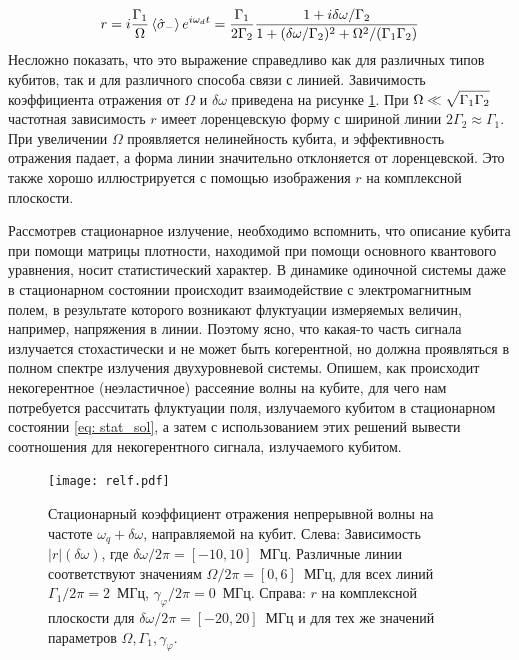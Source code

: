 \begin{equation}
r = i\frac{\Gamma_1}{\Omega}\braket{\hat{\sigma}_-}e^{i\omega_d t} = \frac{\Gamma_1}{2\Gamma_2}\frac{1+i\delta\omega/\Gamma_2}{1+(\delta\omega/\Gamma_2)^2+\Omega^2/(\Gamma_1\Gamma_2)}
\label{eq: refl}
\end{equation}
Несложно показать, что это выражение справедливо как для различных типов кубитов, так и для различного способа связи с линией. Завичимость коэффициента отражения от $\Omega$ и $\delta\omega$ приведена на рисунке \ref{fig: refl}. При $\Omega\ll\sqrt{\Gamma_1\Gamma_2\vphantom{^2}}$ частотная зависимость $r$ имеет лоренцевскую форму с шириной линии $2\Gamma_2\approx\Gamma_1$. При увеличении $\Omega$ проявляется нелинейность кубита, и эффективность отражения падает, а форма линии значительно отклоняется от лоренцевской. Это также хорошо иллюстрируется с помощью изображения $r$ на комплексной плоскости. 

Рассмотрев стационарное излучение, необходимо вспомнить, что описание кубита при помощи матрицы плотности, находимой при помощи основного квантового уравнения, носит статистический характер. В динамике одиночной системы даже в стационарном состоянии происходит взаимодействие с электромагнитным полем, в результате которого возникают флуктуации измеряемых величин, например, напряжения в линии. Поэтому ясно, что какая-то часть сигнала излучается стохастически и не может быть когерентной, но должна проявляться в полном спектре излучения двухуровневой системы. Опишем, как происходит некогерентное (неэластичное) рассеяние волны на кубите, для чего нам потребуется рассчитать флуктуации поля, излучаемого кубитом в стационарном состоянии \eqref{eq: stat_sol}, а затем с использованием этих решений вывести соотношения для некогерентного сигнала, излучаемого кубитом.
\begin{figure}[ht]
	\centering
	\texttt{[image: relf.pdf]}
	\caption[Коэффициент отражения в стационарном состоянии]{Стационарный коэффициент отражения непрерывной волны на частоте $\omega_q+\delta\omega$, направляемой на кубит. Слева: Зависимость $|r|(\delta\omega)$, где $\delta\omega/2\pi=[-10,10]$~МГц. Различные линии соответствуют значениям $\Omega/2\pi=[0,6]$~МГц, для всех линий $\Gamma_1/2\pi=2$~МГц, $\gamma_\varphi/2\pi=0$~МГц. Справа: $r$ на комплексной плоскости для $\delta\omega/2\pi=[-20,20]$~МГц и для тех же значений параметров $\Omega,\Gamma_1,\gamma_\varphi$.  }
	\label{fig: refl}
\end{figure}
